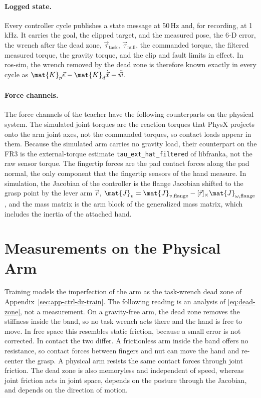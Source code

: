 \paragraph{Logged state.} Every controller cycle publishes a state message at 50\,Hz and, for recording, at 1\,kHz. It carries the goal, the clipped target, and the measured pose, the 6-D error, the wrench after the dead zone, $\vec{\tau}_{\mathrm{task}}$, $\vec{\tau}_{\mathrm{null}}$, the commanded torque, the filtered measured torque, the gravity torque, and the clip and fault limits in effect. In ros-sim, the wrench removed by the dead zone is therefore known exactly in every cycle as $\mat{K}_p\vec{e}-\mat{K}_d\dot{\vec{x}}-\tilde{\vec{w}}$.

\paragraph{Force channels.} The force channels of the teacher have the following counterparts on the physical system. The simulated joint torques are the reaction torques that PhysX projects onto the arm joint axes, not the commanded torques, so contact loads appear in them. Because the simulated arm carries no gravity load, their counterpart on the \ac{FR3} is the external-torque estimate \texttt{tau\_ext\_hat\_filtered} of libfranka, not the raw sensor torque. The fingertip forces are the pad contact forces along the pad normal, the only component that the fingertip sensors of the hand measure. In simulation, the Jacobian of the controller is the flange Jacobian shifted to the grasp point by the lever arm $\vec{r}$, $\mat{J}_v=\mat{J}_{v,\mathrm{flange}}-[\vec{r}]_\times\mat{J}_{\omega,\mathrm{flange}}$, and the mass matrix is the arm block of the generalized mass matrix, which includes the inertia of the attached hand.

\section{Measurements on the Physical Arm}\label{sec:app-ctrl-measure}

Training models the imperfection of the arm as the task-wrench dead zone of Appendix~\ref{sec:app-ctrl-dz-train}. The following reading is an analysis of \eqref{eq:dead-zone}, not a measurement. On a gravity-free arm, the dead zone removes the stiffness inside the band, so no task wrench acts there and the hand is free to move. In free space this resembles static friction, because a small error is not corrected. In contact the two differ. A frictionless arm inside the band offers no resistance, so contact forces between fingers and nut can move the hand and re-center the grasp. A physical arm resists the same contact forces through joint friction. The dead zone is also memoryless and independent of speed, whereas joint friction acts in joint space, depends on the posture through the Jacobian, and depends on the direction of motion.

